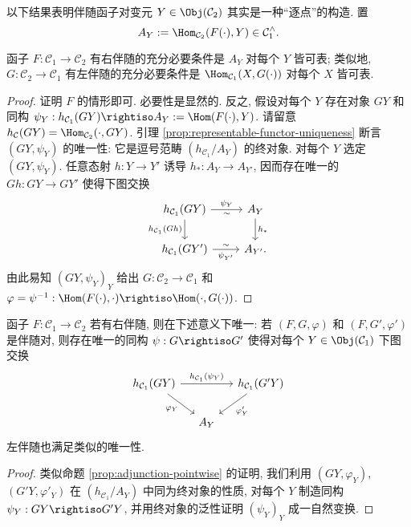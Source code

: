 以下结果表明伴随函子对变元 $Y \in \Obj(\mathcal{C}_2)$ 其实是一种``逐点''的构造. 置
\[ A_Y := \Hom_{\mathcal{C}_2}(F(\cdot), Y) \in \mathcal{C}_1^\wedge. \]

\begin{proposition}\label{prop:adjunction-pointwise}
	函子 $F: \mathcal{C}_1 \to \mathcal{C}_2$ 有右伴随的充分必要条件是 $A_Y$ 对每个 $Y$ 皆可表; 类似地, $G: \mathcal{C}_2 \to \mathcal{C}_1$ 有左伴随的充分必要条件是 $\Hom_{\mathcal{C}_1}(X, G(\cdot))$ 对每个 $X$ 皆可表.
\end{proposition}
\begin{proof}
	证明 $F$ 的情形即可. 必要性是显然的. 反之, 假设对每个 $Y$ 存在对象 $GY$ 和同构 $\psi_Y: h_{\mathcal{C}_1}(GY) \rightiso A_Y := \Hom(F(\cdot), Y)$.  请留意 $h_{\mathcal{C}}(GY) = \Hom_{\mathcal{C}_2}(\cdot, GY)$. 引理 \ref{prop:representable-functor-uniqueness} 断言 $(GY, \psi_Y)$ 的唯一性: 它是逗号范畴 $(h_{\mathcal{C}_1} / A_Y)$ 的终对象. 对每个 $Y$ 选定 $(GY, \psi_Y)$. 任意态射 $h: Y \to Y'$ 诱导 $h_*: A_Y \to A_{Y'}$, 因而存在唯一的 $Gh: GY \to GY'$ 使得下图交换
	\[ \begin{tikzcd}
		h_{\mathcal{C}_1}(GY) \arrow[d, "{h_{\mathcal{C}_1}(Gh)}"'] \arrow[r, "\psi_Y", "\sim"'] & A_Y \arrow[d, "h_*"] \\
		h_{\mathcal{C}_1}(GY') \arrow[r, "{\psi_{Y'}}"', "\sim"] & A_{Y'} .
	\end{tikzcd} \]
	由此易知 $(GY, \psi_Y)_Y$ 给出 $G: \mathcal{C}_2 \to \mathcal{C}_1$ 和 $\varphi = \psi^{-1}: \Hom(F(\cdot), \cdot) \rightiso \Hom(\cdot, G(\cdot))$.
\end{proof}

\begin{proposition}\label{prop:adjunction-uniqueness}
	函子 $F: \mathcal{C}_1 \to \mathcal{C}_2$ 若有右伴随, 则在下述意义下唯一: 若 $(F, G, \varphi)$ 和 $(F, G', \varphi')$ 是伴随对, 则存在唯一的同构 $\psi: G \rightiso G'$ 使得对每个 $Y \in \Obj(\mathcal{C}_1)$ 下图交换
	\[ \begin{tikzcd}[column sep=small]
		h_{\mathcal{C}_1}(GY) \arrow[rr, "{h_{\mathcal{C}_1}(\psi_Y)}"] \arrow[rd, "\varphi_Y"'] & & h_{\mathcal{C}_1}(G'Y) \arrow[ld, "{{\varphi}'_Y}"] \\
		& A_Y &
	\end{tikzcd} \]
	左伴随也满足类似的唯一性.
\end{proposition}
\begin{proof}
	类似命题 \ref{prop:adjunction-pointwise} 的证明, 我们利用 $(GY, \varphi_Y)$, $(G'Y, {\varphi}'_Y)$ 在 $(h_{\mathcal{C}_1} / A_Y)$ 中同为终对象的性质, 对每个 $Y$ 制造同构 $\psi_Y: GY \rightiso G'Y$, 并用终对象的泛性证明 $(\psi_Y)_Y$ 成一自然变换.
\end{proof}

